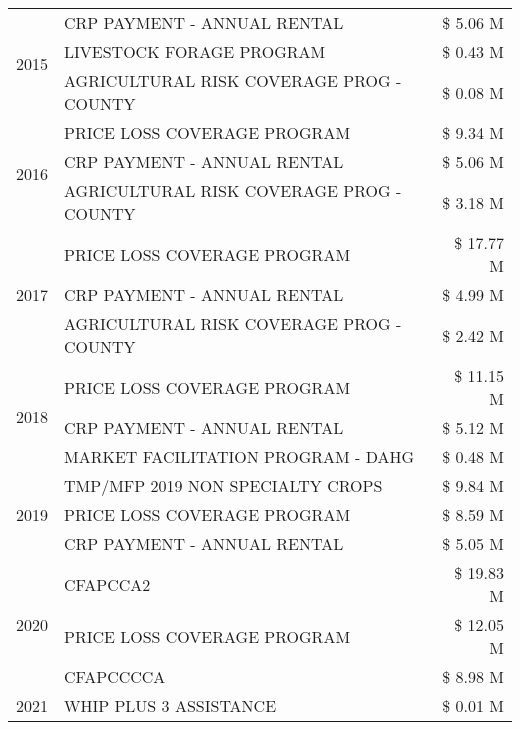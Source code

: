 \begin{tabular}{llr}
\cline{1-3}
\multirow[t]{3}{*}{2015} & CRP PAYMENT - ANNUAL RENTAL & \$ 5.06 M \\
 & LIVESTOCK FORAGE PROGRAM & \$ 0.43 M \\
 & AGRICULTURAL RISK COVERAGE PROG - COUNTY & \$ 0.08 M \\
\cline{1-3}
\multirow[t]{3}{*}{2016} & PRICE LOSS COVERAGE PROGRAM & \$ 9.34 M \\
 & CRP PAYMENT - ANNUAL RENTAL & \$ 5.06 M \\
 & AGRICULTURAL RISK COVERAGE PROG - COUNTY & \$ 3.18 M \\
\cline{1-3}
\multirow[t]{3}{*}{2017} & PRICE LOSS COVERAGE PROGRAM & \$ 17.77 M \\
 & CRP PAYMENT - ANNUAL RENTAL & \$ 4.99 M \\
 & AGRICULTURAL RISK COVERAGE PROG - COUNTY & \$ 2.42 M \\
\cline{1-3}
\multirow[t]{3}{*}{2018} & PRICE LOSS COVERAGE PROGRAM & \$ 11.15 M \\
 & CRP PAYMENT - ANNUAL RENTAL & \$ 5.12 M \\
 & MARKET FACILITATION PROGRAM - DAHG & \$ 0.48 M \\
\cline{1-3}
\multirow[t]{3}{*}{2019} & TMP/MFP 2019 NON SPECIALTY CROPS & \$ 9.84 M \\
 & PRICE LOSS COVERAGE PROGRAM & \$ 8.59 M \\
 & CRP PAYMENT - ANNUAL RENTAL & \$ 5.05 M \\
\cline{1-3}
\multirow[t]{3}{*}{2020} & CFAPCCA2 & \$ 19.83 M \\
 & PRICE LOSS COVERAGE PROGRAM & \$ 12.05 M \\
 & CFAPCCCCA & \$ 8.98 M \\
\cline{1-3}
2021 & WHIP PLUS 3 ASSISTANCE & \$ 0.01 M \\
\cline{1-3}
\bottomrule
\end{tabular}
